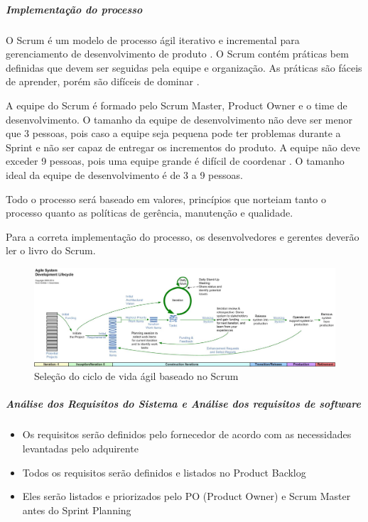 \subparagraph{Implementação do processo}

O Scrum é um modelo de processo ágil iterativo e incremental para gerenciamento de desenvolvimento de produto \cite{scrumwiki:17}. O Scrum contém práticas bem definidas que devem ser seguidas pela equipe e organização. As práticas são fáceis de aprender, porém são difíceis de dominar \cite{Schw01a}. 

A equipe do Scrum é formado pelo Scrum Master, Product Owner e o time de desenvolvimento. O tamanho da equipe de desenvolvimento não deve ser menor que 3 pessoas, pois caso a equipe seja pequena pode ter problemas durante a Sprint e não ser capaz de entregar os incrementos do produto. A equipe não deve exceder 9 pessoas, pois uma equipe grande é difícil de coordenar \cite{Schw01a}. O tamanho ideal da equipe de desenvolvimento é de 3 a 9 pessoas.

Todo o processo será baseado em valores, princípios que norteiam tanto o processo quanto as políticas de gerência, manutenção e qualidade.

Para a correta implementação do processo, os desenvolvedores e gerentes deverão ler o livro do Scrum.

\begin{figure}[!h]
  \centering
  \includegraphics[width=1\textwidth]{softwareengineer/images/agileLifecycleDetailed} 
  \caption{Seleção do ciclo de vida ágil baseado no Scrum \cite{ambysoft:09}}
  \label{fig:scrumlifecycle} 
\end{figure}

\subparagraph{Análise dos Requisitos do Sistema e Análise dos requisitos de software}

\begin{itemize}
  \item Os requisitos serão definidos pelo fornecedor de acordo com as necessidades levantadas pelo adquirente

  \item Todos os requisitos serão definidos e listados no Product Backlog

  \item Eles serão listados e priorizados pelo PO (Product Owner) e Scrum Master antes do Sprint Planning
\end{itemize}

